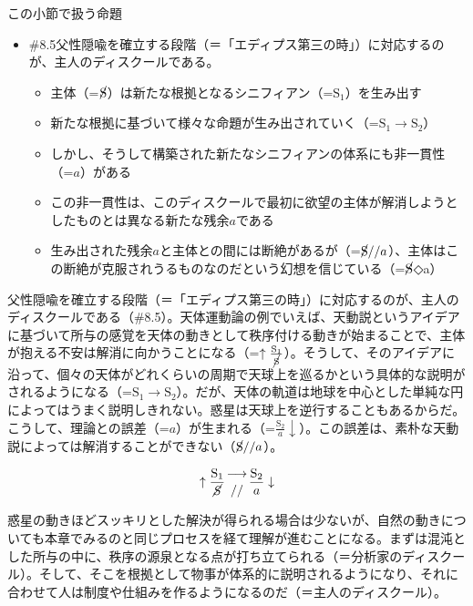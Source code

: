 \begin{note}{この小節で扱う命題}
  \begin{itemize}
    \tightlist
    \item{\#8.5}父性隠喩を確立する段階（＝「エディプス第三の時」）に対応するのが、主人のディスクールである。
      \begin{itemize}
        \tightlist
        \item 主体（=$\cancel{\textrm{S}}$）は新たな根拠となるシニフィアン（=$\textrm{S}_1$）を生み出す
        \item 新たな根拠に基づいて様々な命題が生み出されていく（=$\textrm{S}_1\rightarrow\textrm{S}_2$）
        \item しかし、そうして構築された新たなシニフィアンの体系にも非一貫性（=$a$）がある
        \item この非一貫性は、このディスクールで最初に欲望の主体が解消しようとしたものとは異なる新たな残余$a$である
        \item 生み出された残余$a$と主体との間には断絶があるが（=$\cancel{\textrm{S}}//a$）、主体はこの断絶が克服されうるものなのだという幻想を信じている（=$\cancel{\textrm{S}}$◇a）
      \end{itemize}
  \end{itemize}
\end{note}

父性隠喩を確立する段階（＝「エディプス第三の時」）に対応するのが、主人のディスクールである（\#8.5）。天体運動論の例でいえば、天動説というアイデアに基づいて所与の感覚を天体の動きとして秩序付ける動きが始まることで、主体が抱える不安は解消に向かうことになる（=\(\uparrow\frac{\textrm{S}_1}{\cancel{\textrm{S}}}\)）。そうして、そのアイデアに沿って、個々の天体がどれくらいの周期で天球上を巡るかという具体的な説明がされるようになる（=\(\textrm{S}_1\rightarrow\textrm{S}_2\)）。だが、天体の軌道は地球を中心とした単純な円によってはうまく説明しきれない。惑星は天球上を逆行することもあるからだ。こうして、理論との誤差（=\(a\)）が生まれる（=\(\frac{\textrm{S}_2}{a}\downarrow\)）。この誤差は、素朴な天動説によっては解消することができない（\(\cancel{\textrm{S}}//a\)）。

\[
\uparrow\frac{\mathrm{S_1}}{\mathrm{\cancel{S}}}\genfrac{}{}{0pt}{}{\longrightarrow}{//}\frac{\mathrm{S_2}}{a}\downarrow
\]

惑星の動きほどスッキリとした解決が得られる場合は少ないが、自然の動きについても本章でみるのと同じプロセスを経て理解が進むことになる。まずは混沌とした所与の中に、秩序の源泉となる点が打ち立てられる（＝分析家のディスクール）。そして、そこを根拠として物事が体系的に説明されるようになり、それに合わせて人は制度や仕組みを作るようになるのだ（＝主人のディスクール）。

